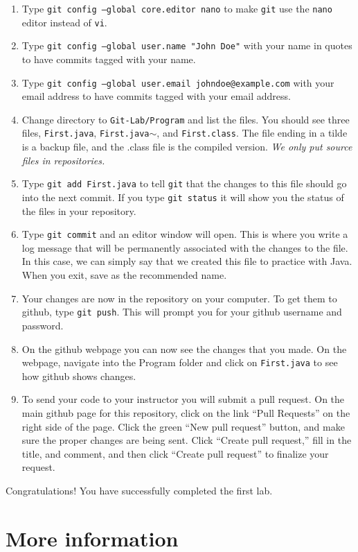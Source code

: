 \documentclass[11pt]{article}
\begin{document}
\begin{enumerate}
\item Type {\tt git config --global core.editor nano} to make {\tt git} use the {\tt nano} editor instead of {\tt vi}.
\item Type {\tt git config --global user.name "John Doe"} with your name in quotes to have commits tagged with your name.
\item Type {\tt git config --global user.email johndoe@example.com} with your email address to have commits tagged with your email address.
\item Change directory to {\tt Git-Lab/Program} and list the files.  You should see three files, {\tt First.java}, {\tt First.java$\sim$}, and {\tt First.class}.  The file ending in a tilde is a backup file, and the .class file is the compiled version.  {\em We only put source files in repositories.}
\item Type {\tt git add First.java} to tell {\tt git} that the changes to this file should go into the next commit.  If you type {\tt git status} it will show you the status of the files in your repository.
\item Type {\tt git commit} and an editor window will open.  This is where you write a log message that will be permanently associated with the changes to the file.  In this case, we can simply say that we created this file to practice with Java.  When you exit, save as the recommended name.
\item Your changes are now in the repository on your computer.  To get them to github, type {\tt git push}.  This will prompt you for your github username and password.
\item On the github webpage you can now see the changes that you made.  On the webpage, navigate into the Program folder and click on {\tt First.java} to see how github shows changes.
\item To send your code to your instructor you will submit a pull request.  On the main github page for this repository, click on the link ``Pull Requests'' on the right side of the page.  Click the green ``New pull request'' button, and make sure the proper changes are being sent.  Click ``Create pull request,'' fill in the title, and comment, and then click ``Create pull request'' to finalize your request.
\end{enumerate}

Congratulations!  You have successfully completed the first lab.

\section*{More information}
\end{document}
